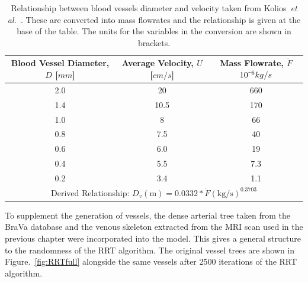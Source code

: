 \documentclass[11pt,english,a4paper,twoside,openright]{report}
\newcommand{\smallminus}{\scalebox{0.5}[1.0]{$-$}}
\begin{document}
{{{{{{{{\begin{table}
	\centering
	\fontsize{8pt}{9pt}\selectfont
	\begin{tabular}{c c c}
		\toprule
		\textbf{Blood Vessel Diameter, $D$ [$mm$]} & \textbf{Average Velocity, $U$ [$cm/s$]} & \textbf{Mass Flowrate, $\dot{F}$ $10^{\smallminus6}kg/s$} \\
		\hline
		2.0 & 20 & 660 \\
		1.4 & 10.5 & 170 \\
		1.0 & 8 & 66 \\
		0.8 & 7.5 & 40 \\
		0.6 & 6.0 & 19 \\
		0.4 & 5.5 & 7.3 \\
		0.2 & 3.4 & 1.1 \\ 
		\multicolumn{3}{c}{Derived Relationship: $D_{v}(\text{m}) = 0.0332*\dot{F}(\text{kg/s})^{0.3703}$} \\ \bottomrule
	\end{tabular}
	\caption[Relationship between blood vessels diameter and velocity]{Relationship between blood vessels diameter and velocity taken from Kolios~\textit{et al.\ }\cite{kolios1995large}. These are converted into mass flowrates and the relationship is given at the base of the table. The units for the variables in the conversion are shown in brackets.}
	\label{tab:DtoFlow}
\end{table}

To supplement the generation of vessels, the dense arterial tree taken from the BraVa database and the venous skeleton extracted from the MRI scan used in the previous chapter were incorporated into the model. This gives a general structure to the randomness of the RRT algorithm. The original vessel trees are shown in Figure.~\ref{fig:RRTfull} alongside the same vessels after 2500 iterations of the RRT algorithm.

}}}}}}}}
\end{document}
